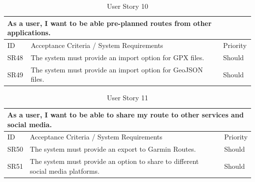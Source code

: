 \begin{table}[!htb]
  \caption{User Story 10}
  \label{tab:user-story-10}
  \begin{tabular}{ m{1cm} m{11cm} m{1cm} }
  \hline
  \multicolumn{3}{p{13cm}}{As a user, I want to be able pre-planned routes from other applications.}\\ 
  \hline
  ID & Acceptance Criteria / System Requirements & Priority\\
  \hline
  \label{SR:48}SR48 & The system must provide an import option for GPX files. & Should\\
  \label{SR:49}SR49 & The system must provide an import option for GeoJSON files. & Should\\
  \hline
  \end{tabular}
\end{table}

\begin{table}[!htb]
  \caption{User Story 11}
  \label{tab:user-story-11}
  \begin{tabular}{ m{1cm} m{11cm} m{1cm} }
  \hline
  \multicolumn{3}{p{13cm}}{As a user, I want to be able to share my route to other services and social media.}\\ 
  \hline
  ID & Acceptance Criteria / System Requirements & Priority\\
  \hline
  \label{SR:50}SR50 & The system must provide an export to Garmin Routes. & Should\\
  \label{SR:51}SR51 & The system must provide an option to share to different social media platforms. & Should\\
  \hline
  \end{tabular}
\end{table}